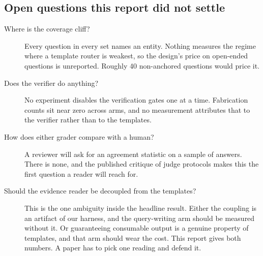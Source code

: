 \subsection{Open questions this report did not settle}

\begin{description}
  \item[Where is the coverage cliff?] Every question in every set names an
    entity. Nothing measures the regime where a template router is weakest, so
    the design's price on open-ended questions is unreported. Roughly 40
    non-anchored questions would price it.
  \item[Does the verifier do anything?] No experiment disables the verification
    gates one at a time. Fabrication counts sit near zero across arms, and no
    measurement attributes that to the verifier rather than to the templates.
  \item[How does either grader compare with a human?] A reviewer will ask for an
    agreement statistic on a sample of answers. There is none, and the published
    critique of judge protocols makes this the first question a reader will
    reach for.
  \item[Should the evidence reader be decoupled from the templates?] This is
    the one ambiguity inside the headline result. Either the coupling is an
    artifact of our harness, and the query-writing arm should be measured
    without it. Or guaranteeing consumable output is a genuine property of
    templates, and that arm should wear the cost. This report gives both
    numbers. A paper has to pick one reading and defend it.
\end{description}
